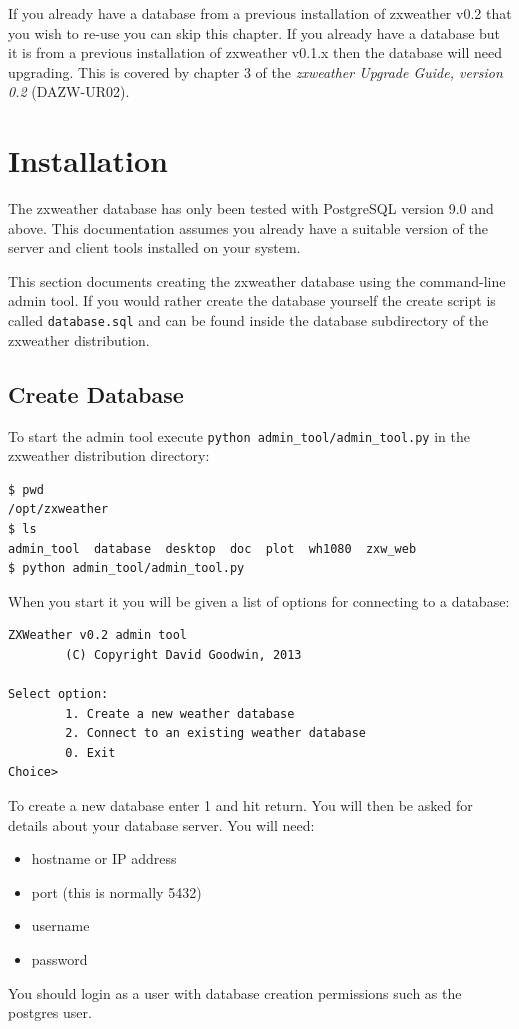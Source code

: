 \documentclass[a4paper,10pt,draft]{book}
\begin{document}

If you already have a database from a previous installation of zxweather v0.2 that you wish to re-use you can skip this chapter. If you already have a database but it is from a previous installation of zxweather v0.1.x then the database will need upgrading. This is covered by chapter 3 of the \emph{zxweather Upgrade Guide, version 0.2} (DAZW-UR02).

\section{Installation}
The zxweather database has only been tested with PostgreSQL version 9.0 and above. This documentation assumes you already have a suitable version of the server and client tools installed on your system.

This section documents creating the zxweather database using the command-line admin tool. If you would rather create the database yourself the create script is called \verb|database.sql| and can be found inside the database subdirectory of the zxweather distribution. 


\subsection{Create Database}
To start the admin tool execute \verb|python admin_tool/admin_tool.py| in the zxweather distribution directory:

\begin{verbatim}
$ pwd
/opt/zxweather
$ ls
admin_tool  database  desktop  doc  plot  wh1080  zxw_web
$ python admin_tool/admin_tool.py
\end{verbatim}

When you start it you will be given a list of options for connecting to a database:
\begin{verbatim}
ZXWeather v0.2 admin tool
        (C) Copyright David Goodwin, 2013

Select option:
        1. Create a new weather database
        2. Connect to an existing weather database
        0. Exit
Choice>
\end{verbatim}

To create a new database enter 1 and hit return. You will then be asked for details about your database server. You will need:
\begin{itemize}
\item hostname or IP address
\item port (this is normally 5432)
\item username
\item password
\end{itemize}
You should login as a user with database creation permissions such as the postgres user.
\end{document}
